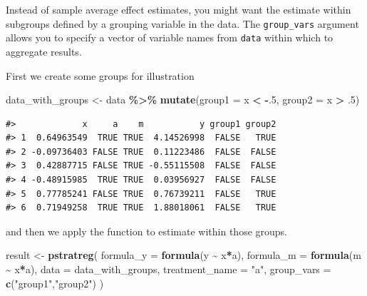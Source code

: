 \documentclass[
]{book}
\newenvironment{Shaded}{\begin{snugshade}}{\end{snugshade}}
\newcommand{\AttributeTok}[1]{\textcolor[rgb]{0.13,0.29,0.53}{#1}}
\newcommand{\DecValTok}[1]{\textcolor[rgb]{0.00,0.00,0.81}{#1}}
\newcommand{\FunctionTok}[1]{\textcolor[rgb]{0.13,0.29,0.53}{\textbf{#1}}}
\newcommand{\NormalTok}[1]{#1}
\newcommand{\OtherTok}[1]{\textcolor[rgb]{0.56,0.35,0.01}{#1}}
\newcommand{\SpecialCharTok}[1]{\textcolor[rgb]{0.81,0.36,0.00}{\textbf{#1}}}
\newcommand{\StringTok}[1]{\textcolor[rgb]{0.31,0.60,0.02}{#1}}
\begin{document}
Instead of sample average effect estimates, you might want the estimate within subgroups defined by a grouping variable in the data. The \texttt{group\_vars} argument allows you to specify a vector of variable names from \texttt{data} within which to aggregate results.

First we create some groups for illustration

\begin{Shaded}
\begin{Highlighting}[]
\NormalTok{data\_with\_groups }\OtherTok{\textless{}{-}}\NormalTok{ data }\SpecialCharTok{\%\textgreater{}\%}
  \FunctionTok{mutate}\NormalTok{(}\AttributeTok{group1 =}\NormalTok{ x }\SpecialCharTok{\textless{}} \SpecialCharTok{{-}}\NormalTok{.}\DecValTok{5}\NormalTok{,}
         \AttributeTok{group2 =}\NormalTok{ x }\SpecialCharTok{\textgreater{}}\NormalTok{ .}\DecValTok{5}\NormalTok{)}
\end{Highlighting}
\end{Shaded}

\begin{verbatim}
#>             x     a    m           y group1 group2
#> 1  0.64963549  TRUE TRUE  4.14526998  FALSE   TRUE
#> 2 -0.09736403 FALSE TRUE  0.11223486  FALSE  FALSE
#> 3  0.42887715 FALSE TRUE -0.55115508  FALSE  FALSE
#> 4 -0.48915985  TRUE TRUE  0.03956927  FALSE  FALSE
#> 5  0.77785241 FALSE TRUE  0.76739211  FALSE   TRUE
#> 6  0.71949258  TRUE TRUE  1.88018061  FALSE   TRUE
\end{verbatim}

and then we apply the function to estimate within those groups.

\begin{Shaded}
\begin{Highlighting}[]
\NormalTok{result }\OtherTok{\textless{}{-}} \FunctionTok{pstratreg}\NormalTok{(}
  \AttributeTok{formula\_y =} \FunctionTok{formula}\NormalTok{(y }\SpecialCharTok{\textasciitilde{}}\NormalTok{ x}\SpecialCharTok{*}\NormalTok{a),}
  \AttributeTok{formula\_m =} \FunctionTok{formula}\NormalTok{(m }\SpecialCharTok{\textasciitilde{}}\NormalTok{ x}\SpecialCharTok{*}\NormalTok{a),}
  \AttributeTok{data =}\NormalTok{ data\_with\_groups,}
  \AttributeTok{treatment\_name =} \StringTok{"a"}\NormalTok{,}
  \AttributeTok{group\_vars =} \FunctionTok{c}\NormalTok{(}\StringTok{"group1"}\NormalTok{,}\StringTok{"group2"}\NormalTok{)}
\NormalTok{)}
\end{Highlighting}
\end{Shaded}
\end{document}
